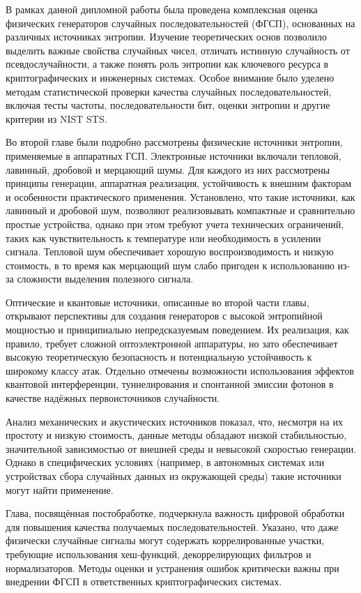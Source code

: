 \clearpage
{}

В рамках данной дипломной работы была проведена комплексная оценка
физических генераторов случайных последовательностей (ФГСП), основанных
на различных источниках энтропии. Изучение теоретических основ позволило
выделить важные свойства случайных чисел, отличать истинную случайность
от псевдослучайности, а также понять роль энтропии как ключевого ресурса
в криптографических и инженерных системах. Особое внимание было уделено
методам статистической проверки качества случайных последовательностей,
включая тесты частоты, последовательности бит, оценки энтропии и другие
критерии из NIST STS.

Во второй главе были подробно рассмотрены физические источники энтропии,
применяемые в аппаратных ГСП. Электронные источники включали тепловой,
лавинный, дробовой и мерцающий шумы. Для каждого из них рассмотрены
принципы генерации, аппаратная реализация, устойчивость к внешним
факторам и особенности практического применения. Установлено, что такие
источники, как лавинный и дробовой шум, позволяют реализовывать
компактные и сравнительно простые устройства, однако при этом требуют
учета технических ограничений, таких как чувствительность к температуре
или необходимость в усилении сигнала. Тепловой шум обеспечивает хорошую
воспроизводимость и низкую стоимость, в то время как мерцающий шум слабо
пригоден к использованию из-за сложности выделения полезного сигнала.

Оптические и квантовые источники, описанные во второй части главы,
открывают перспективы для создания генераторов с высокой энтропийной
мощностью и принципиально непредсказуемым поведением. Их реализация, как
правило, требует сложной оптоэлектронной аппаратуры, но зато
обеспечивает высокую теоретическую безопасность и потенциальную
устойчивость к широкому классу атак. Отдельно отмечены возможности
использования эффектов квантовой интерференции, туннелирования и
спонтанной эмиссии фотонов в качестве надёжных первоисточников
случайности.

Анализ механических и акустических источников показал, что, несмотря на
их простоту и низкую стоимость, данные методы обладают низкой
стабильностью, значительной зависимостью от внешней среды и невысокой
скоростью генерации. Однако в специфических условиях (например, в
автономных системах или устройствах сбора случайных данных из окружающей
среды) такие источники могут найти применение.

Глава, посвящённая постобработке, подчеркнула важность цифровой
обработки для повышения качества получаемых последовательностей.
Указано, что даже физически случайные сигналы могут содержать
коррелированные участки, требующие использования хеш-функций,
декоррелирующих фильтров и нормализаторов. Методы оценки и устранения
ошибок критически важны при внедрении ФГСП в ответственных
криптографических системах.

